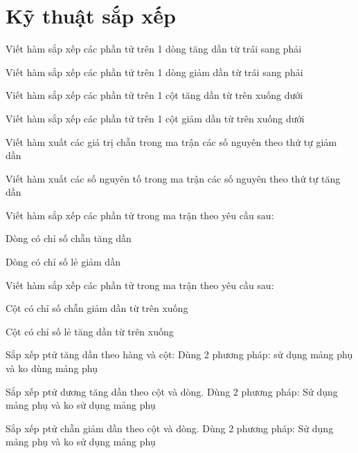 \section{Kỹ thuật sắp xếp}
\begin{problem}
    Viết hàm sắp xếp các phần tử trên 1 dòng tăng dần từ trái sang phải
\end{problem}
\begin{problem}
    Viết hàm sắp xếp các phần tử trên 1 dòng giảm dần từ trái sang phải
\end{problem}
\begin{problem}
    Viết hàm sắp xếp các phần tử trên 1 cột tăng dần từ trên xuống dưới
\end{problem}
\begin{problem}
     Viết hàm sắp xếp các phần tử trên 1 cột giảm dần từ trên xuống dưới
\end{problem}
\begin{problem}
    Viết hàm xuất các giá trị chẵn trong ma trận các số nguyên theo thứ tự giảm dần
\end{problem}
\begin{problem}
    Viết hàm xuất các số nguyên tố trong ma trận các số nguyên theo thứ tự tăng dần
\end{problem}
\begin{problem}
    Viết hàm sắp xếp các phần tử trong ma trận theo yêu cầu sau:

    Dòng có chỉ số chẵn tăng dần

    Dòng có chỉ số lẻ giảm dần                            
\end{problem}
\begin{problem}
    Viết hàm sắp xếp các phần tử trong ma trận theo yêu cầu sau:

    Cột có chỉ số chẵn giảm dần từ trên xuống

    Cột có chỉ số lẻ tăng dần từ trên xuống
\end{problem}
\begin{problem}
    Sắp xếp ptử tăng dần theo hàng và cột: Dùng 2 phương pháp: sử dụng mảng phụ và ko dùng mảng phụ
\end{problem}
\begin{problem}
    Sắp xếp ptử dương tăng dần theo cột và dòng. Dùng 2 phương pháp: Sử dụng mảng phụ và ko sử dụng mảng phụ
\end{problem}
\begin{problem}
    Sắp xếp ptử chẵn giảm dần theo cột và dòng. Dùng 2 phương pháp: Sử dụng mảng phụ và ko sử dụng mảng phụ
\end{problem}
